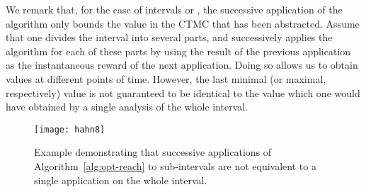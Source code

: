 \documentclass[10pt,twocolumn]{article}
\begin{document}
We remark that, for the case of intervals  or ,
the successive application of the algorithm only bounds the value
in the CTMC that has been abstracted. Assume that one divides the
interval into several parts, and successively applies the algorithm
for each of these parts by using the result of the previous application
as the instantaneous reward of the next application. Doing so allows
us to obtain values at different points of time. However, the last minimal
(or maximal, respectively) value is not guaranteed to be identical to
the value which one would have obtained by a single analysis of the
whole interval.

\begin{figure}
\centering
\texttt{[image: hahn8]}
\caption{\label{fig:nountil}Example demonstrating that successive applications of
  Algorithm~\ref{alg:opt-reach} to sub-intervals are not equivalent to a single
  application on the whole interval.}
\end{figure}
\end{document}
